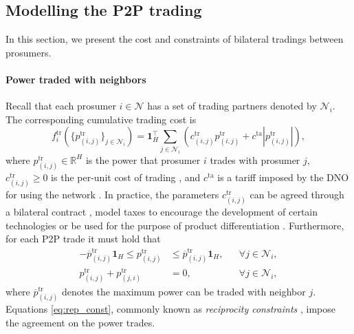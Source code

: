 \documentclass{IEEEtran}  %
\newcommand{\mc}{\mathcal}
\newcommand{\bb}{\mathbb}
\newcommand{\R}{\bb R}
\newcommand{\0}{\mathbf{0}}
\newcommand{\1}{\mathbf{1}}
\begin{document}
\subsection{Modelling the P2P trading}
\label{sec:mod_tr}
 
In this section, we present the cost and constraints of bilateral tradings between prosumers.

\smallskip
\paragraph*{Power traded with neighbors}
Recall that each prosumer $i \in \mc N$ has a set of trading partners denoted by $\mc N_i$. The corresponding cumulative trading cost is 
\begin{equation}
f_{i}^{\mathrm{tr}} \left( \{ p_{(i,j)}^{\mathrm{tr}} \}_{j \in \mc N_i} \right) = 
\1_H^\top \sum_{j\in \mathcal{N}_i} \left(
c_{(i,j)}^{\mathrm{tr}}p_{(i,j)}^{\mathrm{tr}}\!+\! c^{\mathrm{ta}}  |p_{(i,j)}^{\mathrm{tr}}|\right)
,
 \label{eq:f_t}
\end{equation}
where $p_{(i,j)}^{\mathrm{tr}} \in \R^{H}$ is the power that prosumer $i$ trades with prosumer $j$, $c_{(i,j)}^{\mathrm{tr}} \geq 0$ is the per-unit cost of trading \cite{lecadre2020}, and $c^{\mathrm{ta}}$ is a tariff imposed by the DNO for using the network \cite{baroche2019}. In  practice, the parameters $c_{(i,j)}^{\mathrm{tr}}$ can be agreed through a bilateral contract \cite{sousa2019}, model taxes to encourage the development of certain technologies  {or be used for the purpose of product differentiation} \cite{sorin2019,baroche2019,lecadre2020}. Furthermore, for each P2P trade it must hold that
\begin{subequations}
\begin{align}
-\overline{p}_{(i,j)}^{\mathrm{tr}}\1_H \leq p_{(i,j)}^{\mathrm{tr}} &\leq \overline{p}_{(i,j)}^{\mathrm{tr}}\1_H, & & \forall j\in\mathcal{N}_i, \label{eq:p_t_bound}\\
p_{(i,j)}^{\mathrm{tr}}  + p_{(j,i)}^{\mathrm{tr}}&=0, & & \forall j\in\mathcal{N}_i, \label{eq:rep_const}
\end{align}
\label{eq:ptr_cons}%
\end{subequations}
where $ \overline{p}_{(i,j)}^{\mathrm{tr}}$ denotes the maximum power can be traded with neighbor $j$. Equations \eqref{eq:rep_const}, commonly known as \textit{reciprocity constraints} \cite{sousa2019}, impose the agreement on the power trades.

\end{document}
